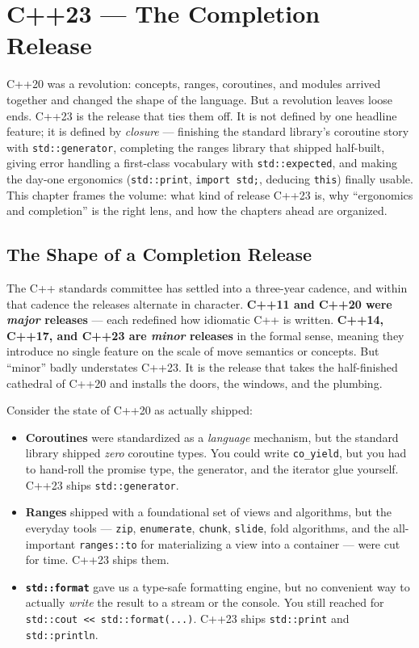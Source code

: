 \chapter{C++23 --- The Completion Release}
\label{ch:cpp23-completion-release}

C++20 was a revolution: concepts, ranges, coroutines, and modules arrived together and changed the shape of the language. But a revolution leaves loose ends. C++23 is the release that ties them off. It is not defined by one headline feature; it is defined by \emph{closure} --- finishing the standard library's coroutine story with \lstinline|std::generator|, completing the ranges library that shipped half-built, giving error handling a first-class vocabulary with \lstinline|std::expected|, and making the day-one ergonomics (\lstinline|std::print|, \lstinline|import std;|, deducing \lstinline|this|) finally usable. This chapter frames the volume: what kind of release C++23 is, why ``ergonomics and completion'' is the right lens, and how the chapters ahead are organized.

\section{The Shape of a Completion Release}

The C++ standards committee has settled into a three-year cadence, and within that cadence the releases alternate in character. \textbf{C++11 and C++20 were \emph{major} releases} --- each redefined how idiomatic C++ is written. \textbf{C++14, C++17, and C++23 are \emph{minor} releases} in the formal sense, meaning they introduce no single feature on the scale of move semantics or concepts. But ``minor'' badly understates C++23. It is the release that takes the half-finished cathedral of C++20 and installs the doors, the windows, and the plumbing.

Consider the state of C++20 as actually shipped:

\begin{itemize}
    \item \textbf{Coroutines} were standardized as a \emph{language} mechanism, but the standard library shipped \emph{zero} coroutine types. You could write \lstinline|co_yield|, but you had to hand-roll the promise type, the generator, and the iterator glue yourself. C++23 ships \lstinline|std::generator|.
    \item \textbf{Ranges} shipped with a foundational set of views and algorithms, but the everyday tools --- \lstinline|zip|, \lstinline|enumerate|, \lstinline|chunk|, \lstinline|slide|, fold algorithms, and the all-important \lstinline|ranges::to| for materializing a view into a container --- were cut for time. C++23 ships them.
    \item \textbf{\lstinline|std::format|} gave us a type-safe formatting engine, but no convenient way to actually \emph{write} the result to a stream or the console. You still reached for \lstinline|std::cout << std::format(...)|. C++23 ships \lstinline|std::print| and \lstinline|std::println|.
\end{itemize}

